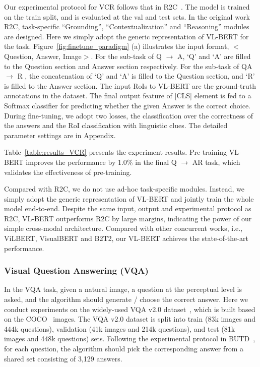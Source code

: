 Our experimental protocol for VCR follows that in R2C~\citep{zellers2019vcr}. The model is trained on the train split, and is evaluated at the val and test sets. In the original work R2C, task-specific ``Grounding'', ``Contextualization'' and ``Reasoning'' modules are designed. Here we simply adopt the generic representation of VL-BERT for the task. Figure~\ref{fig:finetune_paradigm} (a) illustrates the input format, $<$Question, Answer, Image$>$. For the sub-task of Q $\rightarrow$ A, `Q' and `A' are filled to the Question section and Answer section respectively.  For the sub-task of QA $\rightarrow$ R , the concatenation of `Q' and `A' is filled to the Question section, and `R' is filled to the Answer section. The input RoIs to VL-BERT are the ground-truth annotations in the dataset. The final output feature of [CLS] element is fed to a Softmax classifier for predicting whether the given Answer is the correct choice. During fine-tuning, we adopt two losses, the classification over the correctness of the answers and the RoI classification with linguistic clues. The detailed parameter settings are in Appendix.

Table~\ref{table:results_VCR} presents the experiment results. Pre-training VL-BERT improves the performance by 1.0\% in the final Q $\rightarrow$ AR task, which validates the effectiveness of pre-training.

Compared with R2C, we do not use ad-hoc task-specific modules. Instead, we simply adopt the generic representation of VL-BERT and jointly train the whole model end-to-end. Despite the same input, output and experimental protocol as R2C, VL-BERT outperforms R2C by large margins, indicating the power of our simple cross-modal architecture. Compared with other concurrent works, i.e., ViLBERT, VisualBERT and B2T2, our VL-BERT achieves the state-of-the-art performance.  

\subsubsection{Visual Question Answering (VQA)}

In the VQA task, given a natural image, a question at the perceptual level is asked, and the algorithm should generate / choose the correct answer. Here we conduct experiments on the widely-used VQA v2.0 dataset~\citep{goyal2017making}, which is built based on the COCO~\citep{lin2014microsoft} images. The VQA v2.0 dataset is split into train (83k images and 444k questions), validation (41k images and 214k questions), and test (81k images and 448k questions) sets. Following the experimental protocol in BUTD~\citep{anderson2018bottom}, for each question, the algorithm should pick the corresponding answer from a shared set consisting of 3,129 answers.

